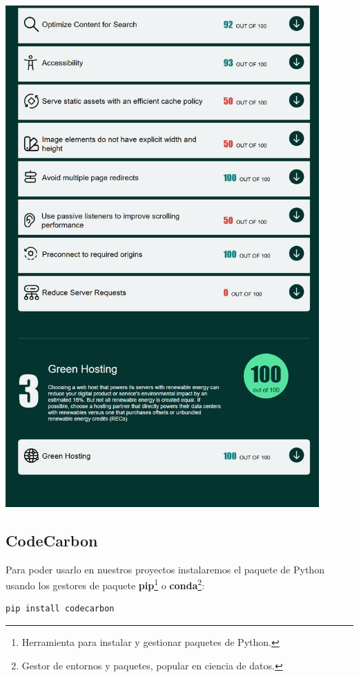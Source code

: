 \documentclass[12pt,a4paper]{report}
\begin{document}
\begin{center}
  \includegraphics[width=0.9\textwidth]{imagenes/Ecograder_5.png}
\end{center}

\subsection{CodeCarbon}
Para poder usarlo en nuestros proyectos instalaremos el paquete de Python
usando los gestores de paquete \textbf{pip}\footnote{Herramienta para instalar
  y gestionar paquetes de Python.} o \textbf{conda}\footnote{Gestor de entornos y
  paquetes, popular en ciencia de datos.}:

\begin{tcolorbox}[colback=codebackground, colframe=codeborder, boxrule=0.8pt, arc=0mm, boxsep=5pt, left=5pt, right=5pt, top=5pt, bottom=5pt]
  \begin{lstlisting}[language=bash]
    pip install codecarbon
  \end{lstlisting}
\end{tcolorbox}
\end{document}
